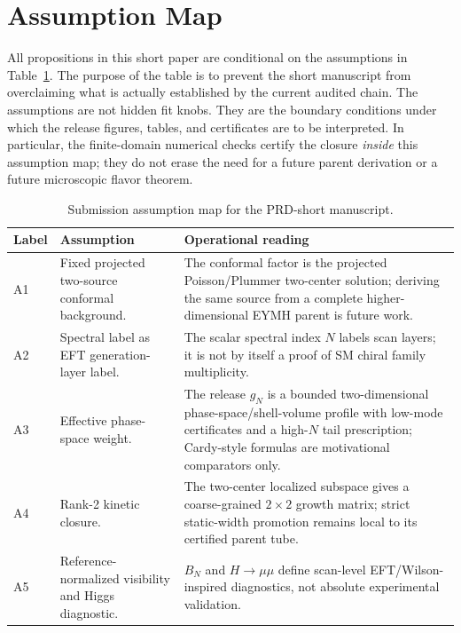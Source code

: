 \documentclass[aps,prd,onecolumn,notitlepage,nofootinbib,superscriptaddress,11pt,floatfix]{revtex4-2}
\begin{document}
\section{Assumption Map}
\label{sec:assumptions}

All propositions in this short paper are conditional on the assumptions in Table~\ref{tab:assumptions}.
The purpose of the table is to prevent the short manuscript from overclaiming what is actually established by the current audited chain.
The assumptions are not hidden fit knobs.
They are the boundary conditions under which the release figures, tables, and certificates are to be interpreted.
In particular, the finite-domain numerical checks certify the closure \emph{inside} this assumption map; they do not erase the need for a future parent derivation or a future microscopic flavor theorem.

\begin{table}[htbp]
\centering
\caption{Submission assumption map for the PRD-short manuscript.}
\label{tab:assumptions}
\small
\setlength{\tabcolsep}{4pt}
\renewcommand{\arraystretch}{1.12}
\begin{tabular}{@{}l l l@{}}
\toprule
\parbox[t]{0.11\textwidth}{\textbf{Label}} & \parbox[t]{0.36\textwidth}{\textbf{Assumption}} & \parbox[t]{0.40\textwidth}{\textbf{Operational reading}} \\
\midrule
\parbox[t]{0.11\textwidth}{A1} & \parbox[t]{0.36\textwidth}{Fixed projected two-source conformal background.} & \parbox[t]{0.40\textwidth}{The conformal factor is the projected Poisson/Plummer two-center solution; deriving the same source from a complete higher-dimensional EYMH parent is future work.} \\
\parbox[t]{0.11\textwidth}{A2} & \parbox[t]{0.36\textwidth}{Spectral label as EFT generation-layer label.} & \parbox[t]{0.40\textwidth}{The scalar spectral index \(N\) labels scan layers; it is not by itself a proof of SM chiral family multiplicity.} \\
\parbox[t]{0.11\textwidth}{A3} & \parbox[t]{0.36\textwidth}{Effective phase-space weight.} & \parbox[t]{0.40\textwidth}{The release \(g_N\) is a bounded two-dimensional phase-space/shell-volume profile with low-mode certificates and a high-\(N\) tail prescription; Cardy-style formulas are motivational comparators only.} \\
\parbox[t]{0.11\textwidth}{A4} & \parbox[t]{0.36\textwidth}{Rank-2 kinetic closure.} & \parbox[t]{0.40\textwidth}{The two-center localized subspace gives a coarse-grained \(2\times2\) growth matrix; strict static-width promotion remains local to its certified parent tube.} \\
\parbox[t]{0.11\textwidth}{A5} & \parbox[t]{0.36\textwidth}{Reference-normalized visibility and Higgs diagnostic.} & \parbox[t]{0.40\textwidth}{\(B_N\) and \(H\to\mu\mu\) define scan-level EFT/Wilson-inspired diagnostics, not absolute experimental validation.} \\
\bottomrule
\end{tabular}
\end{table}
\end{document}

